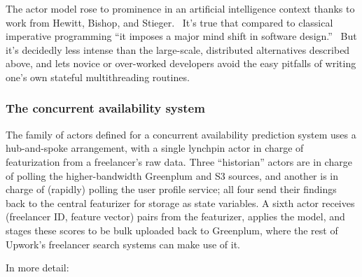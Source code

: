 \documentclass[tablecaption=bottom,wcp]{jmlr}
\begin{document}
The actor model rose to prominence in an artificial intelligence context thanks to
work from Hewitt, Bishop, and Stieger.~\citep{hewitt1973ijcai} It's true that compared
to classical imperative programming ``it imposes a major mind shift in software
design.''~\citep{korland2011thesis} But it's decidedly less intense than the 
large-scale, distributed alternatives described above, and lets novice or 
over-worked developers avoid the easy pitfalls of writing one's own 
stateful multithreading routines.

\subsubsection{The concurrent availability system}


The family of actors defined for a concurrent availability prediction system uses a
hub-and-spoke arrangement, with a single lynchpin actor in charge of featurization
from a freelancer's raw data. Three ``historian'' actors are in charge of polling the 
higher-bandwidth Greenplum and S3 sources, and another is in charge of (rapidly)
polling the user profile service; all four send their findings back to the central
featurizer for storage as state variables. A sixth actor receives (freelancer ID, feature
vector) pairs from the featurizer, applies the model, and stages these scores to be
bulk uploaded back to Greenplum, where the rest of Upwork's freelancer search
systems can make use of it.

In more detail:
\end{document}
